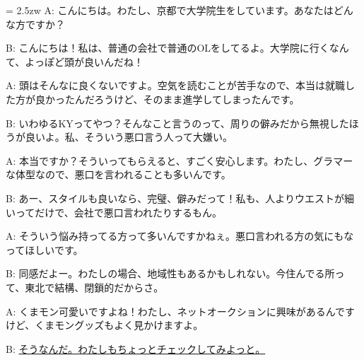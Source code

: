 \documentclass[11pt]{amsart}
\title{}
\author{}
\newenvironment{hangall}[1]{\hangindent = 2.5zw\everypar{\hangindent = 2.5zw}}{}
\begin{document}
\maketitle
\begin{hangall}{}%
A: こんにちは。わたし、京都で大学院生をしています。あなたはどんな方ですか？

B: こんにちは！私は、普通の会社で普通のOLをしてるよ。大学院に行くなんて、よっぽど頭が良いんだね！

A: 頭はそんなに良くないですよ。空気を読むことが苦手なので、本当は就職した方が良かったんだろうけど、そのまま進学してしまったんです。

B: いわゆるKYってやつ？そんなこと言うのって、周りの僻みだから無視したほうが良いよ。私、そういう悪口言う人って大嫌い。

A: 本当ですか？そういってもらえると、すごく安心します。わたし、グラマーな体型なので、悪口を言われることも多いんです。

B: あー、スタイルも良いなら、完璧、僻みだって！私も、人よりウエストが細いってだけで、会社で悪口言われたりするもん。

A: そういう悩み持ってる方って多いんですかねぇ。悪口言われる方の気にもなってほしいです。

B: 同感だよー。わたしの場合、地域性もあるかもしれない。今住んでる所って、東北で結構、閉鎖的だからさ。

A: くまモン可愛いですよね！わたし、ネットオークションに興味があるんですけど、くまモングッズもよく見かけますよ。

B: \ul{そうなんだ。わたしもちょっとチェックしてみよっと。}\end{hangall}
\end{document}
